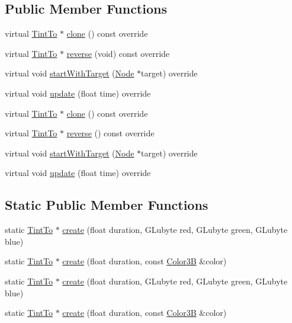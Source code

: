 \subsection*{Public Member Functions}
\begin{DoxyCompactItemize}
\item 
virtual \hyperlink{classTintTo}{Tint\+To} $\ast$ \hyperlink{classTintTo_ad34183f5018f8066b096017bbcfefd02}{clone} () const override
\item 
virtual \hyperlink{classTintTo}{Tint\+To} $\ast$ \hyperlink{classTintTo_a9d85d4b6352bafc35a4c876fa712ae23}{reverse} (void) const override
\item 
virtual void \hyperlink{classTintTo_a1ef6a2ccefbb95cf2234a6671b73609c}{start\+With\+Target} (\hyperlink{classNode}{Node} $\ast$target) override
\item 
virtual void \hyperlink{classTintTo_a09ec73412f7343b89a0a86ca560a1383}{update} (float time) override
\item 
virtual \hyperlink{classTintTo}{Tint\+To} $\ast$ \hyperlink{classTintTo_af52464ac1b16746af6fb510679e1cd90}{clone} () const override
\item 
virtual \hyperlink{classTintTo}{Tint\+To} $\ast$ \hyperlink{classTintTo_af54618f49845bf509f510705e3acfc1f}{reverse} () const override
\item 
virtual void \hyperlink{classTintTo_ad6a3f4c53c94b2af92d5a4b6dfd3181d}{start\+With\+Target} (\hyperlink{classNode}{Node} $\ast$target) override
\item 
virtual void \hyperlink{classTintTo_a1808cd2d0f0e838614c641374856948b}{update} (float time) override
\end{DoxyCompactItemize}
\subsection*{Static Public Member Functions}
\begin{DoxyCompactItemize}
\item 
static \hyperlink{classTintTo}{Tint\+To} $\ast$ \hyperlink{classTintTo_a38dab5b802de88f9f737f76a803d8866}{create} (float duration, G\+Lubyte red, G\+Lubyte green, G\+Lubyte blue)
\item 
static \hyperlink{classTintTo}{Tint\+To} $\ast$ \hyperlink{classTintTo_a7e630fe7840f56deeb09ebfae3828c7d}{create} (float duration, const \hyperlink{structColor3B}{Color3B} \&color)
\item 
static \hyperlink{classTintTo}{Tint\+To} $\ast$ \hyperlink{classTintTo_afc53a16f4ddbf3482641f722ac8e4621}{create} (float duration, G\+Lubyte red, G\+Lubyte green, G\+Lubyte blue)
\item 
static \hyperlink{classTintTo}{Tint\+To} $\ast$ \hyperlink{classTintTo_ae646eff23c3d8820bbaa02a5f00a61d0}{create} (float duration, const \hyperlink{structColor3B}{Color3B} \&color)
\end{DoxyCompactItemize}

